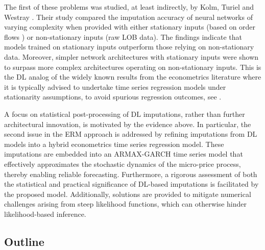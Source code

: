 \documentclass[10pt,a4paper,oneside]{article}
\begin{document}
The first of these problems was studied, at least indirectly, by Kolm, Turiel and Westray \cite{kolm2023deep}. Their study compared the imputation accuracy of neural networks of varying complexity when provided with either stationary inputs (based on order flows \cite{cont2013price}) or non-stationary inputs (raw LOB data). The findings indicate that models trained on stationary inputs outperform those relying on non-stationary data. Moreover, simpler network architectures with stationary inputs were shown to surpass more complex architectures operating on non-stationary inputs. This is the DL analog of the widely known results from the econometrics literature where it is typically advised to undertake time series regression models under stationarity assumptions, to avoid spurious regression outcomes, see \cite{granger1974spurious, phillips1986understanding, hamilton_time_1994}.

A focus on statistical post-processing of DL imputations, rather than further architectural innovation, is motivated by the evidence above. In particular, the second issue in the ERM approach is addressed by refining imputations from DL models into a hybrid econometrics time series regression model. These imputations are embedded into an ARMAX-GARCH time series model that effectively approximates the stochastic dynamics of the micro-price process, thereby enabling reliable forecasting. Furthermore, a rigorous assessment of both the statistical and practical significance of DL-based imputations is facilitated by the proposed model. Additionally, solutions are provided to mitigate numerical challenges arising from steep likelihood functions, which can otherwise hinder likelihood-based inference.

\subsection{Outline}
\label{subsec:outline}
\end{document}
